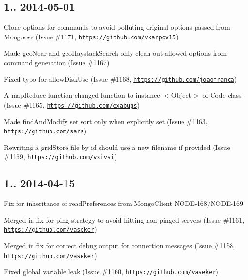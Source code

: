 \subsection*{1.. 2014-\/05-\/01 }


\begin{DoxyItemize}
\item Clone options for commands to avoid polluting original options passed from Mongoose (Issue \#1171, \href{https://github.com/vkarpov15}{\tt https\+://github.\+com/vkarpov15})
\item Made geo\+Near and geo\+Haystack\+Search only clean out allowed options from command generation (Issue \#1167)
\item Fixed typo for allow\+Disk\+Use (Issue \#1168, \href{https://github.com/joaofranca}{\tt https\+://github.\+com/joaofranca})
\item A \textquotesingle{}map\+Reduce\textquotesingle{} function changed \textquotesingle{}function\textquotesingle{} to instance \textquotesingle{}$<$Object$>$\textquotesingle{} of \textquotesingle{}Code\textquotesingle{} class (Issue \#1165, \href{https://github.com/exabugs}{\tt https\+://github.\+com/exabugs})
\item Made find\+And\+Modify set sort only when explicitly set (Issue \#1163, \href{https://github.com/sars}{\tt https\+://github.\+com/sars})
\item Rewriting a grid\+Store file by id should use a new filename if provided (Issue \#1169, \href{https://github.com/vsivsi}{\tt https\+://github.\+com/vsivsi})
\end{DoxyItemize}

\subsection*{1.. 2014-\/04-\/15 }


\begin{DoxyItemize}
\item Fix for inheritance of read\+Preferences from Mongo\+Client N\+O\+D\+E-\/168/\+N\+O\+D\+E-\/169
\item Merged in fix for ping strategy to avoid hitting non-\/pinged servers (Issue \#1161, \href{https://github.com/vaseker}{\tt https\+://github.\+com/vaseker})
\item Merged in fix for correct debug output for connection messages (Issue \#1158, \href{https://github.com/vaseker}{\tt https\+://github.\+com/vaseker})
\item Fixed global variable leak (Issue \#1160, \href{https://github.com/vaseker}{\tt https\+://github.\+com/vaseker})
\end{DoxyItemize}

